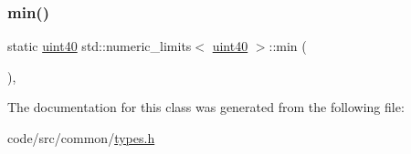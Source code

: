 \subsubsection{\texorpdfstring{min()}{min()}}
{\footnotesize\ttfamily static \hyperlink{classuint40}{uint40} std\+::numeric\+\_\+limits$<$ \hyperlink{classuint40}{uint40} $>$\+::min (\begin{DoxyParamCaption}{ }\end{DoxyParamCaption})\hspace{0.3cm}{\ttfamily [inline]}, {\ttfamily [static]}}



The documentation for this class was generated from the following file\+:\begin{DoxyCompactItemize}
\item 
code/src/common/\hyperlink{types_8h}{types.\+h}\end{DoxyCompactItemize}

